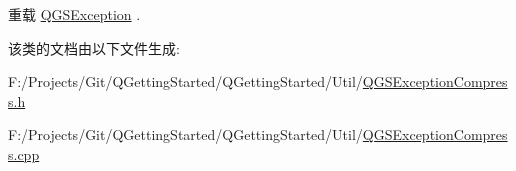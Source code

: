 重载 \mbox{\hyperlink{class_q_g_s_exception_a78e6d3c9f92bbc94440d4c2e946beed2}{Q\+G\+S\+Exception}} .



该类的文档由以下文件生成\+:\begin{DoxyCompactItemize}
\item 
F\+:/\+Projects/\+Git/\+Q\+Getting\+Started/\+Q\+Getting\+Started/\+Util/\mbox{\hyperlink{_q_g_s_exception_compress_8h}{Q\+G\+S\+Exception\+Compress.\+h}}\item 
F\+:/\+Projects/\+Git/\+Q\+Getting\+Started/\+Q\+Getting\+Started/\+Util/\mbox{\hyperlink{_q_g_s_exception_compress_8cpp}{Q\+G\+S\+Exception\+Compress.\+cpp}}\end{DoxyCompactItemize}
